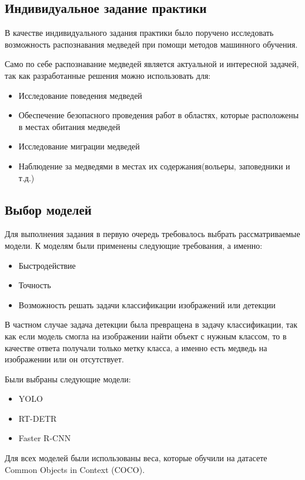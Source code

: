 \documentclass[../document.tex]{subfiles}
\begin{document}
    \subsection{Индивидуальное задание практики}
    \par В качестве индивидуального задания практики было поручено исследовать возможность распознавания медведей при помощи методов машинного обучения.
    \par Само по себе распознавание медведей является актуальной и интересной задачей, так как разработанные решения можно использовать для:
    \begin{itemize}
    	\item Исследование поведения медведей
    	\item Обеспечение безопасного проведения работ в областях, которые расположены в местах обитания медведей
    	\item Исследование миграции медведей
    	\item Наблюдение за медведями в местах их содержания(вольеры, заповедники и т.д.)
    \end{itemize}
    
    \subsection{Выбор моделей}
	    \par Для выполнения задания в первую очередь требовалось выбрать рассматриваемые модели. К моделям были применены следующие требования, а именно:
	    \begin{itemize}
	    	\item Быстродействие
	    	\item Точность
	    	\item Возможность решать задачи классификации изображений или детекции
	    \end{itemize}
	    \par В частном случае задача детекции была превращена в задачу классификации, так как если модель смогла на изображении найти объект с нужным классом, то в качестве ответа получали только метку класса, а именно есть медведь на изображении или он отсутствует.
	    \par Были выбраны следующие модели:
	    \begin{itemize}
	    	\item YOLO
	    	\item RT-DETR
	    	\item Faster R-CNN
	    \end{itemize}
	    \par Для всех моделей были использованы веса, которые обучили на датасете Common Objects in Context (COCO).
    
\end{document}
